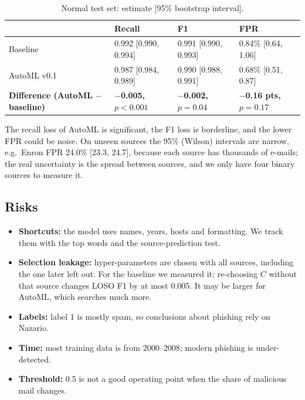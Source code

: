 \documentclass[11pt,a4paper]{article}
\begin{document}
\begin{table}[H]\centering\small
\caption{Normal test set: estimate [95\% bootstrap interval].}
\begin{tabular}{llll}
\toprule
 & Recall & F1 & FPR \\
\midrule
Baseline & 0.992 [0.990, 0.994] & 0.991 [0.990, 0.993] & 0.84\% [0.64, 1.06] \\
AutoML v0.1 & 0.987 [0.984, 0.989] & 0.990 [0.988, 0.991] & 0.68\% [0.51, 0.87] \\
\midrule
\textbf{Difference (AutoML $-$ baseline)} & \textbf{$-$0.005, $p<0.001$} & \textbf{$-$0.002, $p=0.04$} & \textbf{$-$0.16 pts, $p=0.17$} \\
\bottomrule
\end{tabular}
\end{table}
The recall loss of AutoML is significant, the F1 loss is borderline, and the lower FPR could be noise. On unseen sources the 95\% (Wilson) intervals are narrow, e.g.\ Enron FPR 24.0\% [23.3, 24.7], because each source has thousands of e-mails; the real uncertainty is the spread between sources, and we only have four binary sources to measure it.

\subsection{Risks}
\begin{itemize}
\item \textbf{Shortcuts:} the model uses names, years, hosts and formatting. We track them with the top words and the source-prediction test.
\item \textbf{Selection leakage:} hyper-parameters are chosen with all sources, including the one later left out. For the baseline we measured it: re-choosing $C$ without that source changes LOSO F1 by at most 0.005. It may be larger for AutoML, which searches much more.
\item \textbf{Labels:} label 1 is mostly spam, so conclusions about phishing rely on Nazario.
\item \textbf{Time:} most training data is from 2000--2008; modern phishing is under-detected.
\item \textbf{Threshold:} 0.5 is not a good operating point when the share of malicious mail changes.
\end{itemize}
\end{document}

